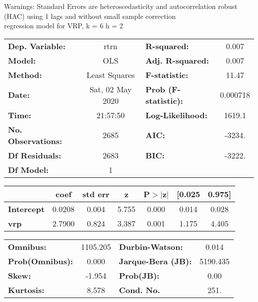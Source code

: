 Warnings: \newline
 [1] Standard Errors are heteroscedasticity and autocorrelation robust (HAC) using 1 lags and without small sample correction\\ 

regression model for VRP, k = 6 h = 2\begin{center}
\begin{tabular}{lclc}
\toprule
\textbf{Dep. Variable:}    &       rtrn       & \textbf{  R-squared:         } &     0.007   \\
\textbf{Model:}            &       OLS        & \textbf{  Adj. R-squared:    } &     0.007   \\
\textbf{Method:}           &  Least Squares   & \textbf{  F-statistic:       } &     11.47   \\
\textbf{Date:}             & Sat, 02 May 2020 & \textbf{  Prob (F-statistic):} &  0.000718   \\
\textbf{Time:}             &     21:57:50     & \textbf{  Log-Likelihood:    } &    1619.1   \\
\textbf{No. Observations:} &        2685      & \textbf{  AIC:               } &    -3234.   \\
\textbf{Df Residuals:}     &        2683      & \textbf{  BIC:               } &    -3222.   \\
\textbf{Df Model:}         &           1      & \textbf{                     } &             \\
\bottomrule
\end{tabular}
\begin{tabular}{lcccccc}
                   & \textbf{coef} & \textbf{std err} & \textbf{z} & \textbf{P$> |$z$|$} & \textbf{[0.025} & \textbf{0.975]}  \\
\midrule
\textbf{Intercept} &       0.0208  &        0.004     &     5.755  &         0.000        &        0.014    &        0.028     \\
\textbf{vrp}       &       2.7900  &        0.824     &     3.387  &         0.001        &        1.175    &        4.405     \\
\bottomrule
\end{tabular}
\begin{tabular}{lclc}
\textbf{Omnibus:}       & 1105.205 & \textbf{  Durbin-Watson:     } &    0.014  \\
\textbf{Prob(Omnibus):} &   0.000  & \textbf{  Jarque-Bera (JB):  } & 5190.435  \\
\textbf{Skew:}          &  -1.954  & \textbf{  Prob(JB):          } &     0.00  \\
\textbf{Kurtosis:}      &   8.578  & \textbf{  Cond. No.          } &     251.  \\
\bottomrule
\end{tabular}
\end{center}

